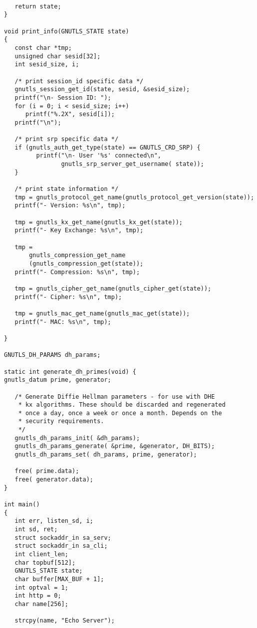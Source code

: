 \begin{verbatim}
   
   return state;
}

void print_info(GNUTLS_STATE state)
{
   const char *tmp;
   unsigned char sesid[32];
   int sesid_size, i;

   /* print session_id specific data */
   gnutls_session_get_id(state, sesid, &sesid_size);
   printf("\n- Session ID: ");
   for (i = 0; i < sesid_size; i++)
      printf("%.2X", sesid[i]);
   printf("\n");

   /* print srp specific data */
   if (gnutls_auth_get_type(state) == GNUTLS_CRD_SRP) {
         printf("\n- User '%s' connected\n",
                gnutls_srp_server_get_username( state));
   }

   /* print state information */
   tmp = gnutls_protocol_get_name(gnutls_protocol_get_version(state));
   printf("- Version: %s\n", tmp);

   tmp = gnutls_kx_get_name(gnutls_kx_get(state));
   printf("- Key Exchange: %s\n", tmp);

   tmp =
       gnutls_compression_get_name
       (gnutls_compression_get(state));
   printf("- Compression: %s\n", tmp);

   tmp = gnutls_cipher_get_name(gnutls_cipher_get(state));
   printf("- Cipher: %s\n", tmp);

   tmp = gnutls_mac_get_name(gnutls_mac_get(state));
   printf("- MAC: %s\n", tmp);

}

GNUTLS_DH_PARAMS dh_params;

static int generate_dh_primes(void) {
gnutls_datum prime, generator;

   /* Generate Diffie Hellman parameters - for use with DHE
    * kx algorithms. These should be discarded and regenerated
    * once a day, once a week or once a month. Depends on the
    * security requirements.
    */
   gnutls_dh_params_init( &dh_params);
   gnutls_dh_params_generate( &prime, &generator, DH_BITS);
   gnutls_dh_params_set( dh_params, prime, generator);

   free( prime.data);
   free( generator.data);
}

int main()
{
   int err, listen_sd, i;
   int sd, ret;
   struct sockaddr_in sa_serv;
   struct sockaddr_in sa_cli;
   int client_len;
   char topbuf[512];
   GNUTLS_STATE state;
   char buffer[MAX_BUF + 1];
   int optval = 1;
   int http = 0;
   char name[256];

   strcpy(name, "Echo Server");


\end{verbatim}
